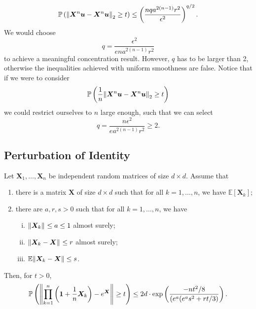 \[ \mathbb{P}\left(\norm{\bm{X}^{n}\bm{u}-\bm{X}^{n}\bm{u}}_{2} \geq t\right)  \leq  \left(\frac{nqa^{2(n-1)}r^{2}}{\epsilon^{2}}\right)^{q/2}. \]
We would choose 
\[ q= \frac{\epsilon^2}{ena^{2(n-1)}r^2} \]
to achieve a meaningful concentration result. However, \( q \) has to be larger than 2, otherwise the inequalities achieved with uniform smoothness are false. Notice that if we were to consider 
\[ \mathbb{P}\left(\frac{1}{n}\norm{\bm{X}^{n}\bm{u}-\bm{X}^{n}\bm{u}}_{2} \geq t\right)  \]
we could restrict ourselves to \( n \) large enough, such that we can select 
\[ q= \frac{n\epsilon^2}{ea^{2(n-1)}r^2}  \geq 2.\]



\subsection{Perturbation of Identity}

\begin{thm}
  \label{pertidentity}
    Let \( \bm{X}_1, \dots, \bm{X}_n \) be independent random matrices of size \( d \times d \). Assume that 
    \begin{enumerate}[1)]
      \item there is a matrix \( \bm{X} \) of size \( d \times d \) such that for all \( k=1, \dots, n \), we have \(\mathbb{E}\left[\bm{X}_k\right]\);
      \item there are \( a,r,s >0 \) such that for all \( k=1,\dots, n \), we have 
        \begin{enumerate}[i)]
          \item \( \norm{\bm{X}_k}_{} \leq a \leq 1 \) almost surely;
          \item \( \norm{\bm{X}_k-\bm{X}}_{} \leq r\) almost surely;
          \item \( \mathbb{E}\norm{\bm{X}_k-\bm{X}} \leq s \).
        \end{enumerate}
    \end{enumerate} 
    Then, for \( t >0  \), 
  \[\mathbb{P}\left(\norm{\prod_{k=1}^{n}\left(\bm{1}+\frac{1}{n}\bm{X}_k\right)-e^{\bm{X}}}_{} \geq t \right) \leq 2d \cdot \operatorname{exp}\left(\frac{-nt^2/8}{(e^{a}(e^a s^2+rt/3)}\right) .\]
\end{thm}

